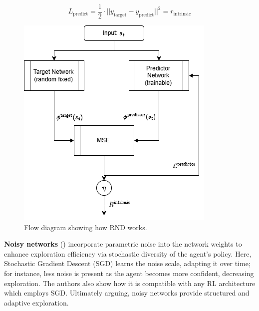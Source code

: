 \begin{equation}
    L_{\text{predict}} = \frac{1}{2} \cdot ||y_{\text{target}} - y_{\text{predict}} ||^2 = r_{\text{intrinsic}}
\label{eq:RND_1}
\end{equation}

\begin{figure}[H]
    \centering
    \includegraphics[width=0.5\linewidth]{figures/LiteratureStudy/RL_diagram_RND.png}
    \caption{Flow diagram showing how RND works.}
    \label{fig:RND}
\end{figure}

\textbf{Noisy networks} (\cite{fortunato2017noisy}) incorporate parametric noise into the network weights to enhance exploration efficiency via stochastic diversity of the agent's policy. Here, Stochastic Gradient Descent (SGD) learns the noise scale, adapting it over time; for instance, less noise is present as the agent becomes more confident, decreasing exploration. The authors also show how it is compatible with any RL architecture which employs SGD. Ultimately arguing, noisy networks provide structured and adaptive exploration.
